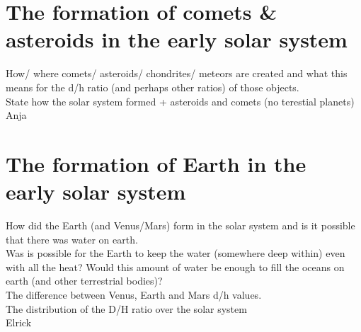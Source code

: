 \documentclass[11pt]{article}
\begin{document}



\newpage				%
\setcounter{page}{0}
\thispagestyle{empty}	%



\newpage				%
\renewcommand{\contentsname}{Table of Contents}
\tableofcontents		%
\thispagestyle{empty}	%


\newpage				%



\section{The formation of comets \& asteroids in the early solar system}
How/ where comets/ asteroids/ chondrites/ meteors are created and what this means for the d/h ratio (and perhaps other ratios) of those objects.\\
State how the solar system formed + asteroids and comets (no terestial planets)\\
Anja

\section{The formation of Earth in the early solar system}
How did the Earth (and Venus/Mars) form in the solar system and is it possible that there was water on earth.\\
Was is possible for the Earth to keep the water (somewhere deep within) even with all the heat?
Would this amount of water be enough to fill the oceans on earth (and other terrestrial bodies)?\\
The difference between Venus, Earth and Mars d/h values.\\
The distribution of the D/H ratio over the solar system\\
Elrick
\end{document}

